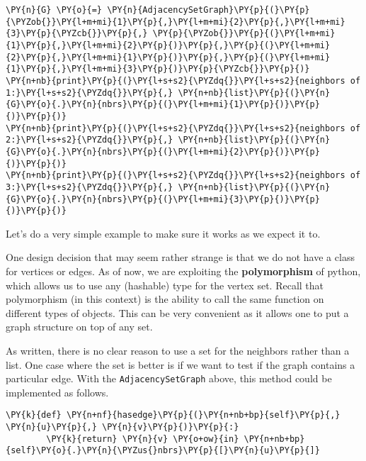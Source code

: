 \begin{Verbatim}[commandchars=\\\{\}]
\PY{n}{G} \PY{o}{=} \PY{n}{AdjacencySetGraph}\PY{p}{(}\PY{p}{\PYZob{}}\PY{l+m+mi}{1}\PY{p}{,}\PY{l+m+mi}{2}\PY{p}{,}\PY{l+m+mi}{3}\PY{p}{\PYZcb{}}\PY{p}{,} \PY{p}{\PYZob{}}\PY{p}{(}\PY{l+m+mi}{1}\PY{p}{,}\PY{l+m+mi}{2}\PY{p}{)}\PY{p}{,}\PY{p}{(}\PY{l+m+mi}{2}\PY{p}{,}\PY{l+m+mi}{1}\PY{p}{)}\PY{p}{,}\PY{p}{(}\PY{l+m+mi}{1}\PY{p}{,}\PY{l+m+mi}{3}\PY{p}{)}\PY{p}{\PYZcb{}}\PY{p}{)}
\PY{n+nb}{print}\PY{p}{(}\PY{l+s+s2}{\PYZdq{}}\PY{l+s+s2}{neighbors of 1:}\PY{l+s+s2}{\PYZdq{}}\PY{p}{,} \PY{n+nb}{list}\PY{p}{(}\PY{n}{G}\PY{o}{.}\PY{n}{nbrs}\PY{p}{(}\PY{l+m+mi}{1}\PY{p}{)}\PY{p}{)}\PY{p}{)}
\PY{n+nb}{print}\PY{p}{(}\PY{l+s+s2}{\PYZdq{}}\PY{l+s+s2}{neighbors of 2:}\PY{l+s+s2}{\PYZdq{}}\PY{p}{,} \PY{n+nb}{list}\PY{p}{(}\PY{n}{G}\PY{o}{.}\PY{n}{nbrs}\PY{p}{(}\PY{l+m+mi}{2}\PY{p}{)}\PY{p}{)}\PY{p}{)}
\PY{n+nb}{print}\PY{p}{(}\PY{l+s+s2}{\PYZdq{}}\PY{l+s+s2}{neighbors of 3:}\PY{l+s+s2}{\PYZdq{}}\PY{p}{,} \PY{n+nb}{list}\PY{p}{(}\PY{n}{G}\PY{o}{.}\PY{n}{nbrs}\PY{p}{(}\PY{l+m+mi}{3}\PY{p}{)}\PY{p}{)}\PY{p}{)}
\end{Verbatim}



Let's do a very simple example to make sure it works as we expect it to.


One design decision that may seem rather strange is that we do not have a class for vertices or edges.
As of now, we are exploiting the \textbf{polymorphism} of python, which allows us to use any (hashable) type for the vertex set.
Recall that polymorphism (in this context) is the ability to call the same function on different types of objects.
This can be very convenient as it allows one to put a graph structure on top of any set.


As written, there is no clear reason to use a set for the neighbors rather than a list.
One case where the set is better is if we want to test if the graph contains a particular edge.  With the \texttt{AdjacencySetGraph} above, this method could be implemented as follows.

\begin{Verbatim}[commandchars=\\\{\}]
    \PY{k}{def} \PY{n+nf}{hasedge}\PY{p}{(}\PY{n+nb+bp}{self}\PY{p}{,} \PY{n}{u}\PY{p}{,} \PY{n}{v}\PY{p}{)}\PY{p}{:}
        \PY{k}{return} \PY{n}{v} \PY{o+ow}{in} \PY{n+nb+bp}{self}\PY{o}{.}\PY{n}{\PYZus{}nbrs}\PY{p}{[}\PY{n}{u}\PY{p}{]}
\end{Verbatim}



